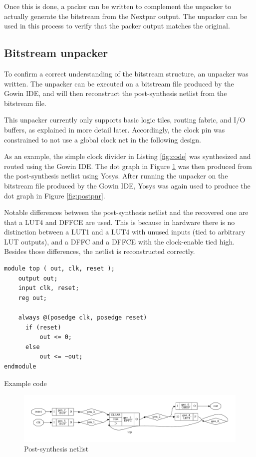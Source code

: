 \documentclass{article}
\begin{document}
Once this is done, a packer can be written to complement the unpacker to actually generate the bitstream from the Nextpnr output. The unpacker can be used in this process to verify that the packer output matches the original.


\subsection{Bitstream unpacker}

To confirm a correct understanding of the bitstream structure, an unpacker was written. The unpacker can be executed on a bitstream file produced by the Gowin IDE, and will then reconstruct the post-synthesis netlist from the bitstream file.

This unpacker currently only supports basic logic tiles, routing fabric, and I/O buffers, as explained in more detail later. Accordingly, the clock pin was constrained to not use a global clock net in the following design.

As an example, the simple clock divider in Listing \ref{fig:code} was synthesized and routed using the Gowin IDE. The dot graph in Figure \ref{fig:postsynth} was then produced from the post-synthesis netlist using Yosys. After running the unpacker on the bitstream file produced by the Gowin IDE, Yosys was again used to produce the dot graph in Figure \ref{fig:postpnr}.

Notable differences between the post-synthesis netlist and the recovered one are that a LUT4 and DFFCE are used. This is because in hardware there is no distinction between a LUT1 and a LUT4 with unused inputs (tied to arbitrary LUT outputs), and a DFFC and a DFFCE with the clock-enable tied high. Besides those differences, the netlist is reconstructed correctly.

\begin{listing}
        \centering
\begin{verbatim}
module top ( out, clk, reset );
    output out;
    input clk, reset;
    reg out;

    always @(posedge clk, posedge reset)
      if (reset)
          out <= 0;
      else
          out <= ~out;
endmodule
\end{verbatim}
    \caption{Example code}
    \label{fig:code}
\end{listing}


\begin{figure}
    \centering
    \includegraphics[width=\textwidth]{fig/post_syn.pdf}
    \caption{Post-synthesis netlist}
    \label{fig:postsynth}
\end{figure}
\end{document}
